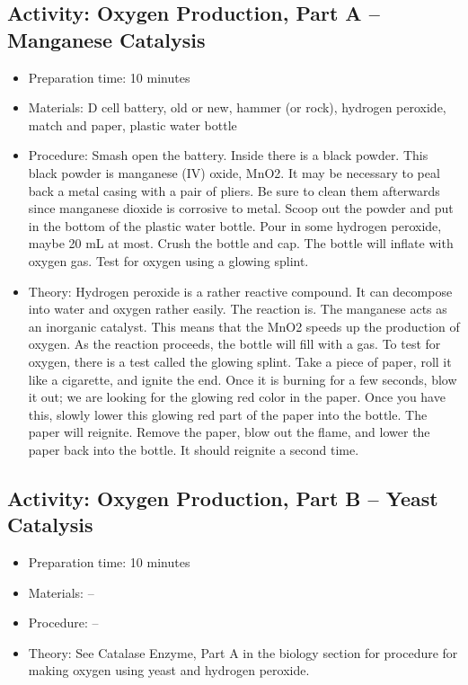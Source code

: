 \begin{itemize}
{\begin{itemize}
\begin{itemize}
{\subsection{Activity: Oxygen Production, Part A – Manganese Catalysis}
\begin{itemize}
\item{Preparation time: 10 minutes}
\item{Materials: D cell battery, old or new, hammer (or rock), hydrogen peroxide, match and paper, plastic water bottle}
\item{Procedure: Smash open the battery. Inside there is a black powder. This black powder is manganese (IV) oxide, MnO2. It may be necessary to peal back a metal casing with a pair of pliers. Be sure to clean them afterwards since manganese dioxide is corrosive to metal. Scoop out the powder and put in the bottom of the plastic water bottle. Pour in some hydrogen peroxide, maybe 20 mL at most. Crush the bottle and cap. The bottle will inflate with oxygen gas. Test for oxygen using a glowing splint.}
\item{Theory: Hydrogen peroxide is a rather reactive compound. It can decompose into water and oxygen rather easily. The reaction is. The manganese acts as an inorganic catalyst. This means that the MnO2 speeds up the production of oxygen. As the reaction proceeds, the bottle will fill with a gas. To test for oxygen, there is a test called the glowing splint. Take a piece of paper, roll it like a cigarette, and ignite the end. Once it is burning for a few seconds, blow it out; we are looking for the glowing red color in the paper. Once you have this, slowly lower this glowing red part of the paper into the bottle. The paper will reignite. Remove the paper, blow out the flame, and lower the paper back into the bottle. It should reignite a second time.}
\end{itemize}

\subsection{Activity: Oxygen Production, Part B – Yeast Catalysis}
\begin{itemize}
\item{Preparation time: 10 minutes}
\item{Materials: --}
\item{Procedure: --}
\item{Theory: See Catalase Enzyme, Part A in the biology section for procedure for making oxygen using yeast and hydrogen peroxide. }
\end{itemize}

}
\end{itemize}
\end{itemize}}
\end{itemize}
